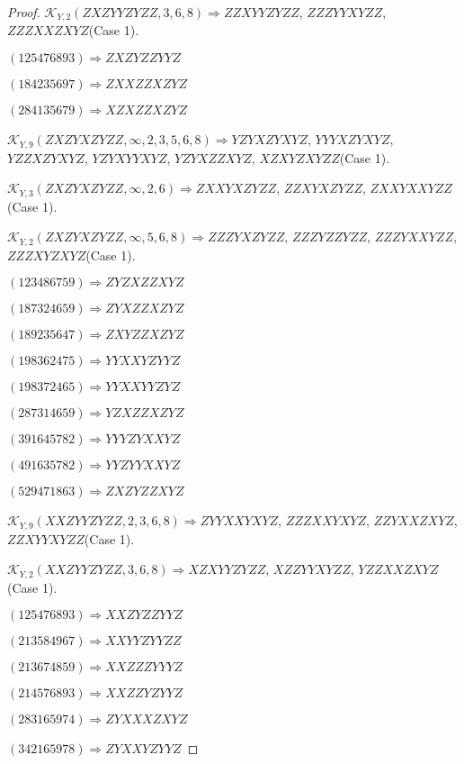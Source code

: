 \documentclass[12pt]{article}
\theoremstyle{plain}
\theoremstyle{definition}
\theoremstyle{remark}
\newcommand{\fancy}[1]{\mathcal{#1}}
\def\K{\fancy{K}}
\begin{document}
\begin{proof}
	$\K_{Y,2}(ZXZYYZYZZ,3, 6, 8)\Rightarrow $$ZZXYYZYZZ$, $ZZZYYXYZZ$, $ZZZXXZXYZ$(Case 1).
	
	
	
	$(1 2 5 4 7 6 8 9 3)\Rightarrow ZXZYZZYYZ$
	
	$(1 8 4 2 3 5 6 9 7)\Rightarrow ZXXZZXZYZ$
	
	$(2 8 4 1 3 5 6 7 9)\Rightarrow XZXZZXZYZ$
	
	
	
	$\K_{Y,9}(ZXZYXZYZZ,\infty,2, 3, 5, 6, 8)\Rightarrow $$YZYXZYXYZ$, $YYYXZYXYZ$, $YZZXZYXYZ$, $YZYXYYXYZ$, $YZYXZZXYZ$, $XZXYZXYZZ$(Case 1).
	
	$\K_{Y,3}(ZXZYXZYZZ,\infty,2, 6)\Rightarrow $$ZXXYXZYZZ$, $ZZXYXZYZZ$, $ZXXYXXYZZ$(Case 1).
	
	$\K_{Y,2}(ZXZYXZYZZ,\infty,5, 6, 8)\Rightarrow $$ZZZYXZYZZ$, $ZZZYZZYZZ$, $ZZZYXXYZZ$, $ZZZXYZXYZ$(Case 1).
	
	
	
	$(1 2 3 4 8 6 7 5 9)\Rightarrow ZYZXZZXYZ$
	
	$(1 8 7 3 2 4 6 5 9)\Rightarrow ZYXZZXZYZ$
	
	$(1 8 9 2 3 5 6 4 7)\Rightarrow ZXYZZXZYZ$
	
	$(1 9 8 3 6 2 4 7 5)\Rightarrow YYXXYZYYZ$
	
	$(1 9 8 3 7 2 4 6 5)\Rightarrow YYXXYYZYZ$
	
	$(2 8 7 3 1 4 6 5 9)\Rightarrow YZXZZXZYZ$
	
	$(3 9 1 6 4 5 7 8 2)\Rightarrow YYYZYXXYZ$
	
	$(4 9 1 6 3 5 7 8 2)\Rightarrow YYZYYXXYZ$
	
	$(5 2 9 4 7 1 8 6 3)\Rightarrow ZXZYZZXYZ$
	
	
	
	$\K_{Y,9}(XXZYYZYZZ,2, 3, 6, 8)\Rightarrow $$ZYYXXYXYZ$, $ZZZXXYXYZ$, $ZZYXXZXYZ$, $ZZXYYXYZZ$(Case 1).
	
	$\K_{Y,2}(XXZYYZYZZ,3, 6, 8)\Rightarrow $$XZXYYZYZZ$, $XZZYYXYZZ$, $YZZXXZXYZ$(Case 1).
	
	
	
	$(1 2 5 4 7 6 8 9 3)\Rightarrow XXZYZZYYZ$
	
	$(2 1 3 5 8 4 9 6 7)\Rightarrow XXYYZYYZZ$
	
	$(2 1 3 6 7 4 8 5 9)\Rightarrow XXZZZYYYZ$
	
	$(2 1 4 5 7 6 8 9 3)\Rightarrow XXZZYZYYZ$
	
	$(2 8 3 1 6 5 9 7 4)\Rightarrow ZYXXXZXYZ$
	
	$(3 4 2 1 6 5 9 7 8)\Rightarrow ZYXXYZYYZ$
	

\end{proof}
\end{document}
